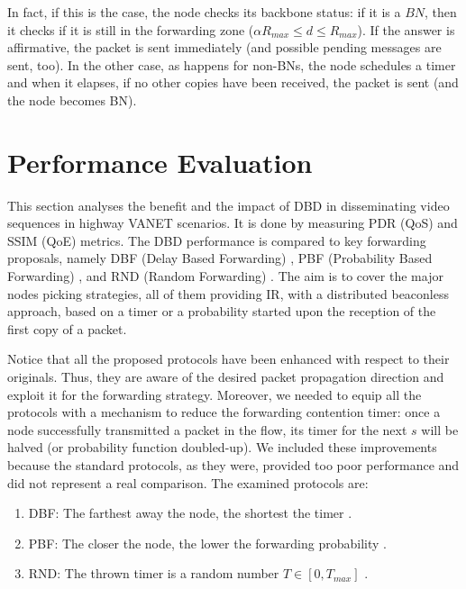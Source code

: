 \documentclass{sig-alternate-2013}
\begin{document}
In fact, if this is the case, the node checks its backbone status: if it is a $BN$, then it checks if it is still in the forwarding zone ($\alpha R_{max} \le d \le R_{max}$). If the answer is affirmative, the packet is sent immediately (and possible pending messages are sent, too). In the other case, as happens for non-BNs, the node schedules a timer and when it elapses, if no other copies have been received, the packet is sent (and the node becomes BN).








\section{Performance Evaluation}
\label{performance}

This section analyses the benefit and the impact of DBD in disseminating video sequences in highway VANET scenarios. It is done by measuring PDR (QoS) and SSIM (QoE) metrics. The DBD performance is compared to key forwarding proposals, namely DBF (Delay Based Forwarding) \cite{DDT}, PBF (Probability Based Forwarding) \cite{PBF}, and RND (Random Forwarding) \cite{RND}.  The aim is to cover the major nodes picking strategies, all of them providing IR, with a distributed beaconless approach, based on a timer or a probability started upon the reception of the first copy of a packet.

Notice that all the proposed protocols have been enhanced with respect to their originals. Thus, they are aware of the desired packet propagation direction and exploit it for the forwarding strategy. Moreover, we needed to equip all the protocols with a mechanism to reduce the forwarding contention timer: once a node successfully transmitted a packet in the flow, its timer for the next $s$ will be halved (or probability function doubled-up). We included these improvements because the standard protocols, as they were, provided too poor performance and did not represent a real comparison.
The examined protocols are:
\begin{enumerate}
	\item DBF: The farthest away the node, the shortest the timer \cite{DDT}.
	\item PBF: The closer the node, the lower the forwarding probability \cite{PBF}.
	\item RND: The thrown timer is a random number $T \in [0,T_{max}]$ \cite{RND}.
\end{enumerate}
\end{document}
